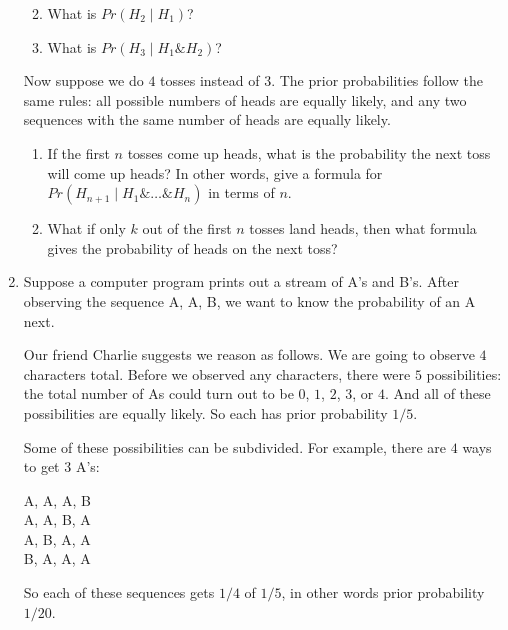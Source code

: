 \documentclass[justified]{tufte-book}
\providecommand{\tightlist}{%
  \setlength{\itemsep}{0pt}\setlength{\parskip}{0pt}}
\newcommand{\given}{\mid}
\renewcommand{\wedge}{\mathbin{\&}}
\newcommand{\p}{Pr}
\theoremstyle{definition}
\theoremstyle{definition}
\theoremstyle{definition}
\theoremstyle{definition}
\theoremstyle{remark}
\begin{document}
\begin{enumerate}
  \begin{enumerate}
  \def\labelenumii{\alph{enumii}.}
  \tightlist
  \item
    What is \(\p(H_2 \given H_1)\)?
  \item
    What is \(\p(H_3 \given H_1 \wedge H_2)\)?
  \end{enumerate}

  Now suppose we do \(4\) tosses instead of \(3\). The prior probabilities follow the same rules: all possible numbers of heads are equally likely, and any two sequences with the same number of heads are equally likely.

  \begin{enumerate}
  \def\labelenumii{\alph{enumii}.}
  \setcounter{enumii}{2}
  \tightlist
  \item
    If the first \(n\) tosses come up heads, what is the probability the next toss will come up heads? In other words, give a formula for \(\p(H_{n+1} \given H_1 \wedge \ldots \wedge H_n)\) in terms of \(n\).
  \item
    What if only \(k\) out of the first \(n\) tosses land heads, then what formula gives the probability of heads on the next toss?
  \end{enumerate}
\item
  Suppose a computer program prints out a stream of A's and B's. After observing the sequence A, A, B, we want to know the probability of an A next.

  Our friend Charlie suggests we reason as follows. We are going to observe \(4\) characters total. Before we observed any characters, there were \(5\) possibilities: the total number of As could turn out to be \(0\), \(1\), \(2\), \(3\), or \(4\). And all of these possibilities are equally likely. So each has prior probability \(1/5\).

  Some of these possibilities can be subdivided. For example, there are \(4\) ways to get \(3\) A's:

  A, A, A, B\\
  A, A, B, A\\
  A, B, A, A\\
  B, A, A, A

  So each of these sequences gets \(1/4\) of \(1/5\), in other words prior probability \(1/20\).


\end{enumerate}
\end{document}

